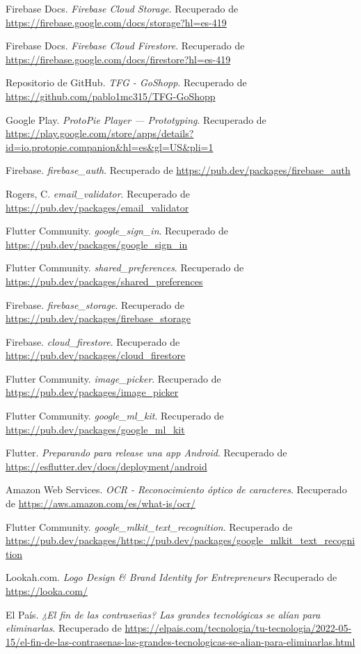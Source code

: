 \documentclass{article}
\begin{document}
\begin{thebibliography}{0}
 Firebase Docs. \textit{Firebase Cloud Storage}. Recuperado de \url{https://firebase.google.com/docs/storage?hl=es-419}

 Firebase Docs. \textit{Firebase Cloud Firestore}. Recuperado de \url{https://firebase.google.com/docs/firestore?hl=es-419}

 Repositorio de GitHub. \textit{TFG - GoShopp}. Recuperado de \url{https://github.com/pablo1mc315/TFG-GoShopp}

 Google Play. \textit{ProtoPie Player — Prototyping}. Recuperado de \url{https://play.google.com/store/apps/details?id=io.protopie.companion&hl=es&gl=US&pli=1}

 Firebase. \textit{firebase\_auth}. Recuperado de \url{https://pub.dev/packages/firebase_auth}

 Rogers, C. \textit{email\_validator}. Recuperado de \url{https://pub.dev/packages/email_validator}

 Flutter Community. \textit{google\_sign\_in}. Recuperado de \url{https://pub.dev/packages/google_sign_in}

 Flutter Community. \textit{shared\_preferences}. Recuperado de \url{https://pub.dev/packages/shared_preferences}

 Firebase. \textit{firebase\_storage}. Recuperado de \url{https://pub.dev/packages/firebase_storage}

 Firebase. \textit{cloud\_firestore}. Recuperado de \url{https://pub.dev/packages/cloud_firestore}

 Flutter Community. \textit{image\_picker}. Recuperado de \url{https://pub.dev/packages/image_picker}

 Flutter Community. \textit{google\_ml\_kit}. Recuperado de \url{https://pub.dev/packages/google_ml_kit}

 Flutter. \textit{Preparando para release una app Android}. Recuperado de \url{https://esflutter.dev/docs/deployment/android}

 Amazon Web Services. \textit{OCR - Reconocimiento óptico de caracteres}. Recuperado de \url{https://aws.amazon.com/es/what-is/ocr/}

 Flutter Community. \textit{google\_mlkit\_text\_recognition}. Recuperado de \url{https://pub.dev/packages/https://pub.dev/packages/google_mlkit_text_recognition}

 Lookah.com. \textit{Logo Design \& Brand Identity for Entrepreneurs} Recuperado de \url{https://looka.com/}

 El País. \textit{¿El fin de las contraseñas? Las grandes tecnológicas se alían para eliminarlas}. Recuperado de \url{https://elpais.com/tecnologia/tu-tecnologia/2022-05-15/el-fin-de-las-contrasenas-las-grandes-tecnologicas-se-alian-para-eliminarlas.html}

\end{thebibliography}
\end{document}
